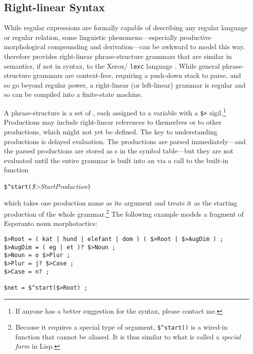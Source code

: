 \subsection{Right-linear Syntax}

While regular expressions are formally capable of describing any
regular language or regular relation, some linguistic
phenomena---especially productive morphological compounding and
derivation---can be awkward to model this way.  \Kleene{}
therefore provides right-linear phrase-structure grammars that
are similar in semantics, if not in syntax, to the
Xerox/ \texttt{lexc} language \citep{beesley+karttunen:2003}.  While general phrase-structure
grammars are context-free, requiring a push-down stack to parse, and so go beyond
regular power, a right-linear (or left-linear) grammar is regular and so can be
compiled into a finite-state machine.  


A \Kleene{} phrase-structure  is a set of
, each
assigned to a variable with a \verb!$>! sigil.\footnote{If anyone has a better
suggestion for the syntax, please contact me.}  Productions may
include right-linear references to themselves or to other
productions, which might not yet be defined.  The key to understanding
productions is delayed evaluation.  The productions are parsed
immediately---and the parsed productions are stored as s in the
symbol table---but they are not evaluated until the entire grammar is built
into an \fsm{} via a call to the built-in function

\vspace{0.5cm}
\verb!$^start(!\emph{\$>StartProduction}\verb!)!
\vspace{0.5cm}

\noindent
which takes one production
name as its argument and treats it as the starting production of the whole
grammar.\footnote{Because it requires a special type of argument, \verb!$^start()!
is a wired-in function that cannot be aliased.  It is thus similar to what is called
a \emph{special form} in Lisp.}
The following example models a fragment of Esperanto noun morphotactics:

\begin{Verbatim}
$>Root = ( kat | hund | elefant | dom ) ( $>Root | $>AugDim ) ;
$>AugDim = ( eg | et )? $>Noun ;
$>Noun = o $>Plur ;
$>Plur = j? $>Case ;
$>Case = n? ;

$net = $^start($>Root) ;
\end{Verbatim}

